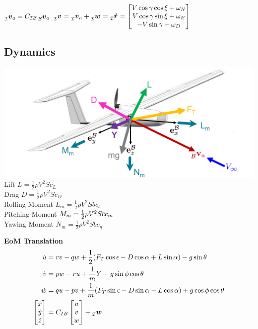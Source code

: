 \documentclass[a4paper, 8pt]{extarticle}
\newcommand{\mvec}[3]{  \prescript{}{\mathcal{#1}}{\bm{#2}}  _{#3} }
\begin{document}
\begin{multicols*}{3}
$\mvec{\mathcal{I}}{v}{a}=C_{\mathcal{IB}}\mvec{\mathcal{B}}{v}{a}$
$\mvec{\mathcal{I}}{v}{}=\mvec{\mathcal{I}}{v}{a}+\mvec{\mathcal{I}}{w}{}=\mvec{\mathcal{I}}{\dot{r}}{}=\begin{bmatrix}
V\cos{\gamma}\cos{\xi}+\omega_{N}\\
V\cos{\gamma}\sin{\xi}+\omega_{E}\\
-V\sin{\gamma}+\omega_{D}
\end{bmatrix}$


\subsection{Dynamics}
\includegraphics[width=1\linewidth]{images/FW_Dynamics.PNG}
Lift $L=\frac{1}{2}\rho V^2Sc_{L}$\\
Drag $D=\frac{1}{2}\rho V^2 S c_{D}$\\
Rolling Moment $L_{m}=\frac{1}{2}\rho V^2 S b c_{l}$\\
Pitching Moment $M_{m}=\frac{1}{2}\rho V^2 S \overline{\rm c} c_{m}$\\
Yawing Moment $N_{m}=\frac{1}{2}\rho V^2 S b c_{n}$\\
\newline

\textbf{EoM Translation}
\begin{align*}
    \dot{u} &= rv-qw+\frac{1}{2}(F_{T}\cos{\epsilon}-D\cos{\alpha}+L\sin{\alpha})-g\sin{\theta}\\
    \dot{v} &=pw-ru+\frac{1}{m}Y+g\sin{\phi}\cos{\theta}\\
    \dot{w} &=qu-pv+\frac{1}{m}(F_{T}\sin{\epsilon}-D\sin{\alpha}-L\cos{\alpha})+g\cos{\phi}\cos{\theta}\\
    \begin{bmatrix} \dot{x} \\ \dot{y} \\ \dot{z} \end{bmatrix} &= C_{IB}\begin{bmatrix}
    u\\v\\w \end{bmatrix}+\mvec{\mathcal{I}}{w}{}
\end{align*}


\end{multicols*}
\end{document}
